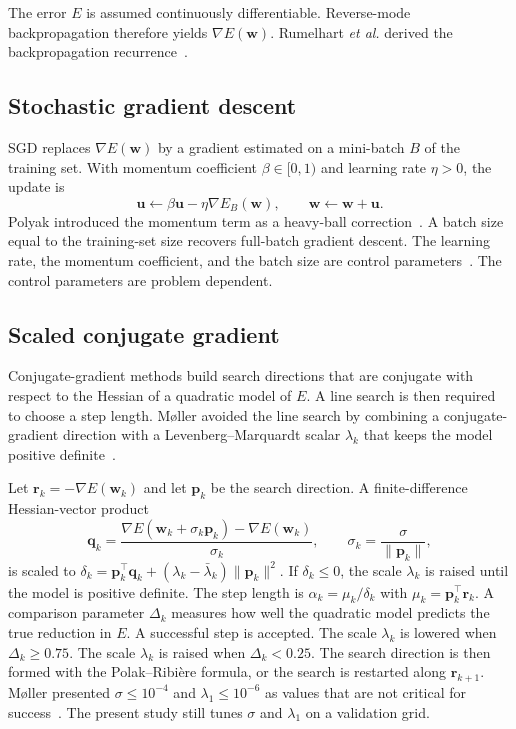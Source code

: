 \documentclass[conference,10pt]{IEEEtran}
\begin{document}
The error $E$ is assumed continuously differentiable.
Reverse-mode backpropagation therefore yields $\nabla E(\mathbf{w})$.
Rumelhart \textit{et al.} derived the backpropagation recurrence~\cite{rumelhart1986}.

\subsection{Stochastic gradient descent}
\label{sec:sgd}
SGD replaces $\nabla E(\mathbf{w})$ by a gradient estimated on a mini-batch $B$ of the training set.
With momentum coefficient $\beta\in[0,1)$ and learning rate $\eta>0$, the update is
\begin{equation}
\mathbf{u}\leftarrow \beta\mathbf{u}-\eta\nabla E_{B}(\mathbf{w}), \qquad
\mathbf{w}\leftarrow\mathbf{w}+\mathbf{u}.
\end{equation}
Polyak introduced the momentum term as a heavy-ball correction~\cite{polyak1964}.
A batch size equal to the training-set size recovers full-batch gradient descent.
The learning rate, the momentum coefficient, and the batch size are control parameters~\cite{lecun1998}.
The control parameters are problem dependent.

\subsection{Scaled conjugate gradient}
\label{sec:scg}
Conjugate-gradient methods build search directions that are conjugate with respect to the Hessian of a quadratic model of $E$.
A line search is then required to choose a step length.
M{\o}ller avoided the line search by combining a conjugate-gradient direction with a Levenberg--Marquardt scalar $\lambda_{k}$ that keeps the model positive definite~\cite{moller1993}.

Let $\mathbf{r}_{k}=-\nabla E(\mathbf{w}_{k})$ and let $\mathbf{p}_{k}$ be the search direction.
A finite-difference Hessian-vector product
\begin{equation}
\mathbf{q}_{k}=\frac{\nabla E(\mathbf{w}_{k}+\sigma_{k}\mathbf{p}_{k})-\nabla E(\mathbf{w}_{k})}{\sigma_{k}},
\qquad \sigma_{k}=\frac{\sigma}{\lVert\mathbf{p}_{k}\rVert},
\end{equation}
is scaled to $\delta_{k}=\mathbf{p}_{k}^{\top}\mathbf{q}_{k}+(\lambda_{k}-\bar{\lambda}_{k})\lVert\mathbf{p}_{k}\rVert^{2}$.
If $\delta_{k}\le 0$, the scale $\lambda_{k}$ is raised until the model is positive definite.
The step length is $\alpha_{k}=\mu_{k}/\delta_{k}$ with $\mu_{k}=\mathbf{p}_{k}^{\top}\mathbf{r}_{k}$.
A comparison parameter $\Delta_{k}$ measures how well the quadratic model predicts the true reduction in $E$.
A successful step is accepted.
The scale $\lambda_{k}$ is lowered when $\Delta_{k}\ge 0.75$.
The scale $\lambda_{k}$ is raised when $\Delta_{k}<0.25$.
The search direction is then formed with the Polak--Ribi\`ere formula, or the search is restarted along $\mathbf{r}_{k+1}$.
M{\o}ller presented $\sigma\le 10^{-4}$ and $\lambda_{1}\le 10^{-6}$ as values that are not critical for success~\cite{moller1993}.
The present study still tunes $\sigma$ and $\lambda_{1}$ on a validation grid.
\end{document}
